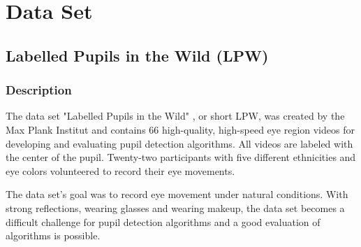

\chapter{Data Set}
\section{Labelled Pupils in the Wild (LPW)}
\subsection{Description}

The data set "Labelled Pupils in the Wild" \cite{zhang_max-planck-institut_2016}, or short LPW, was created by the Max Plank Institut and contains 66 high-quality, high-speed eye region videos for developing and evaluating pupil detection algorithms. All videos are labeled with the center of the pupil. Twenty-two participants with five different ethnicities and eye colors volunteered to record their eye movements.  

The data set's goal was to record eye movement under natural conditions. With strong reflections, wearing glasses and wearing makeup, the data set becomes a difficult challenge for pupil detection algorithms and a good evaluation of algorithms is possible.


